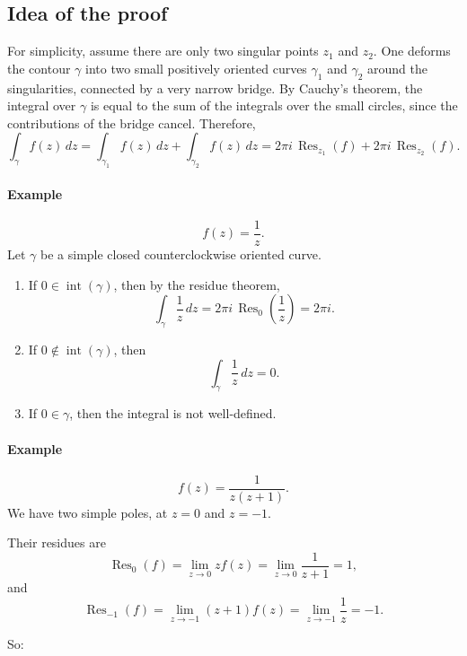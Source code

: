 \subsection{Idea of the proof}

For simplicity, assume there are only two singular points $z_1$ and $z_2$. One deforms the contour $\gamma$ into two small positively oriented curves $\gamma_1$ and $\gamma_2$ around the singularities, connected by a very narrow bridge. By Cauchy's theorem, the integral over $\gamma$ is equal to the sum of the integrals over the small circles, since the contributions of the bridge cancel. Therefore,
\[
\int_\gamma f(z)\,dz
=
\int_{\gamma_1} f(z)\,dz
+
\int_{\gamma_2} f(z)\,dz
=
2\pi i\,\operatorname{Res}_{z_1}(f)
+
2\pi i\,\operatorname{Res}_{z_2}(f).
\]

\paragraph{Example}

\[
f(z)=\frac{1}{z}.
\]
Let $\gamma$ be a simple closed counterclockwise oriented curve.

\begin{enumerate}
    \item If $0\in \operatorname{int}(\gamma)$, then by the residue theorem,
    \[
    \int_\gamma \frac{1}{z}\,dz = 2\pi i\,\operatorname{Res}_0\!\left(\frac{1}{z}\right)=2\pi i.
    \]

    \item If $0\notin \operatorname{int}(\gamma)$, then
    \[
    \int_\gamma \frac{1}{z}\,dz=0.
    \]

    \item If $0\in \gamma$, then the integral is not well-defined.
\end{enumerate}

\paragraph{Example}
\[
f(z)=\frac{1}{z(z+1)}.
\]
We have two simple poles, at $z=0$ and $z=-1$.

Their residues are
\[
\operatorname{Res}_0(f)
=
\lim_{z\to 0} zf(z)
=
\lim_{z\to 0}\frac{1}{z+1}
=1,
\]
and
\[
\operatorname{Res}_{-1}(f)
=
\lim_{z\to -1}(z+1)f(z)
=
\lim_{z\to -1}\frac{1}{z}
=-1.
\]

So:

